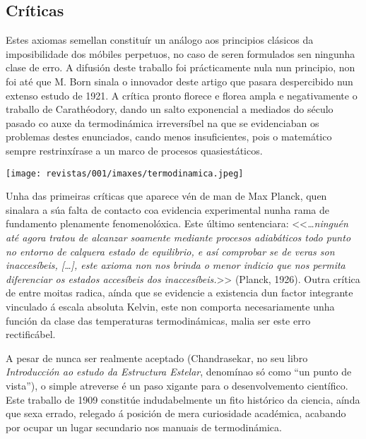 \begin{refsection}
\begin{multicols}{2}
\subsection*{Críticas}

Estes axiomas semellan constituír un análogo aos principios clásicos da
imposibilidade dos móbiles perpetuos, no caso de seren formulados sen ningunha
clase de erro. A difusión deste traballo foi prácticamente nula nun principio,
non foi até que M. Born sinala o innovador deste artigo que pasara despercibido
nun extenso estudo de 1921. A crítica pronto florece e florea ampla e
negativamente o traballo de Carathéodory, dando un salto exponencial a mediados
do século pasado co auxe da termodinámica irreversíbel na que se evidenciaban
os problemas destes enunciados, cando menos insuficientes, pois o matemático
sempre restrinxírase a un marco de procesos quasiestáticos.

\begin{center}
    \texttt{[image: revistas/001/imaxes/termodinamica.jpeg]}
\end{center}


Unha das primeiras críticas que aparece vén de man de Max Planck, quen sinalara
a súa falta de contacto coa evidencia experimental nunha rama de fundamento
plenamente fenomenolóxica. Este último sentenciara: <<\textit{…ninguén até
agora tratou de alcanzar soamente mediante procesos adiabáticos todo punto no
entorno de calquera estado de equilibrio, e así comprobar se de veras son
inaccesíbeis, […], este axioma non nos brinda o menor indicio que nos permita
diferenciar os estados accesíbeis dos inaccesíbeis.}>> (Planck, 1926). Outra
crítica de entre moitas radica, aínda que se evidencie a existencia dun factor
integrante vinculado á escala absoluta Kelvin, este non comporta necesariamente
unha función da clase das temperaturas termodinámicas, malia ser este erro
rectificábel.

A pesar de nunca ser realmente aceptado (Chandrasekar, no seu libro
\textit{Introducción ao estudo da Estructura Estelar}, denomínao só como ``un
punto de vista''), o simple atreverse é un paso xigante para o desenvolvemento
científico. Este traballo de 1909 constitúe indudabelmente un fito histórico da
ciencia, aínda que sexa errado, relegado á posición de mera curiosidade
académica, acabando por ocupar un lugar secundario nos manuais de
termodinámica.


\end{multicols}
\end{refsection}
